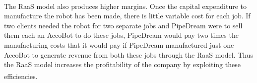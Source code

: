 \documentclass[11pt]{article}		%
\newcommand{\supercite}[1]{\textsuperscript{\cite{#1}}}		%
\begin{document}
            \\
            \hspace*{3ex}The RaaS model also produces higher margins. Once the capital expenditure to manufacture the robot has been made, there is little variable cost for each job. If two clients needed the robot for two separate jobs and PipeDream were to sell them each an AccoBot to do these jobs, PipeDream would pay two times the manufacturing costs that it would pay if PipeDream manufactured just one AccoBot to generate revenue from both these jobs through the RaaS model. Thus the RaaS model increases the profitability of the company by exploiting these efficiencies.\supercite{monetise_RaaS}
            
            
\end{document}
